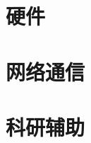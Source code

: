 \documentclass[UTF8]{ctexbook}
\begin{document}
{{{    }%

   }%

  \section{硬件}{

   }%

  \section{网络通信}{

   }%

  \section{科研辅助}{

   }

 }%
\end{document}

